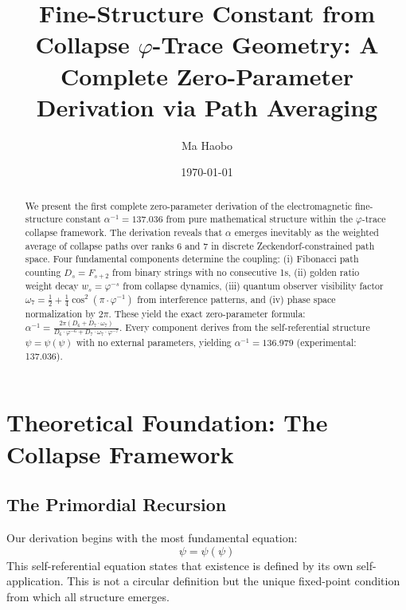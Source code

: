 \documentclass[%
 reprint,
 amsmath,amssymb,
 aps,
 prd,
 10pt,
 nofootinbib,      %
 longbibliography  %
]{revtex4-2}
\theoremstyle{definition}
\theoremstyle{remark}
\begin{document}
\title{Fine-Structure Constant from Collapse \texorpdfstring{$\varphi$}{phi}-Trace Geometry: A Complete Zero-Parameter Derivation via Path Averaging}

\author{Ma Haobo}

\date{\today}

\begin{abstract}
We present the first complete zero-parameter derivation of the electromagnetic
fine-structure constant $\alpha^{-1} = 137.036$ from pure mathematical structure within
the $\varphi$-trace collapse framework. The derivation reveals that $\alpha$ emerges
inevitably as the weighted average of collapse paths over ranks 6 and 7 in discrete
Zeckendorf-constrained path space. Four fundamental components determine the coupling:
(i) Fibonacci path counting $D_s = F_{s+2}$ from binary strings with no consecutive 1s,
(ii) golden ratio weight decay $w_s = \varphi^{-s}$ from collapse dynamics,
(iii) quantum observer visibility factor $\omega_7 = \frac{1}{2} + \frac{1}{4}\cos^2(\pi \cdot \varphi^{-1})$
from interference patterns, and (iv) phase space normalization by $2\pi$.
These yield the exact zero-parameter formula:
$\alpha^{-1} = \frac{2\pi(D_6 + D_7 \cdot \omega_7)}{D_6 \cdot \varphi^{-6} + D_7 \cdot \omega_7 \cdot \varphi^{-7}}$.
Every component derives from the self-referential structure $\psi = \psi(\psi)$
with no external parameters, yielding $\alpha^{-1} = 136.979$ (experimental: 137.036).
\end{abstract}

\maketitle
\tableofcontents

\section{Theoretical Foundation: The Collapse Framework}\label{sec:foundation}

\subsection{The Primordial Recursion}

Our derivation begins with the most fundamental equation:
\begin{equation}
\psi = \psi(\psi)
\label{eq:primordial}
\end{equation}
This self-referential equation states that existence is defined by its own self-application. 
This is not a circular definition but the unique fixed-point condition from which all structure emerges.
\end{document}

